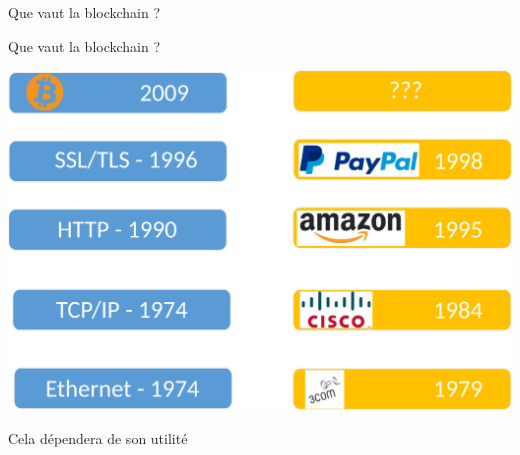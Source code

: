 \documentclass[presentation]{beamer}
\begin{document}
\begin{frame}[label={sec:org88d23fe}]{Que vaut la blockchain ?}
\begin{block}{Que vaut la blockchain ?}
\begin{center}
\includegraphics[width=.8\linewidth]{Pictures/layers_btc.png}
\end{center}
\begin{block}{Cela dépendera de son utilité}
\end{block}
\end{block}
\end{frame}
\end{document}
